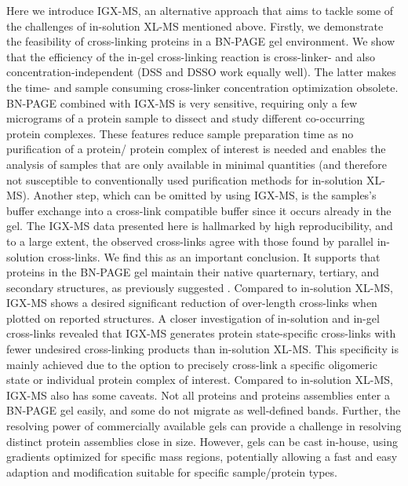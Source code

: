Here we introduce IGX-MS, an alternative approach that aims to tackle some of the challenges of in-solution XL-MS mentioned above. Firstly, we demonstrate the feasibility of cross-linking proteins in a BN-PAGE gel environment. We show that the efficiency of the in-gel cross-linking reaction is cross-linker- and also concentration-independent (DSS and DSSO work equally well). The latter makes the time- and sample consuming cross-linker concentration optimization obsolete. BN-PAGE combined with IGX-MS is very sensitive, requiring only a few micrograms of a protein sample to dissect and study different co-occurring protein complexes. These features reduce sample preparation time as no purification of a protein/ protein complex of interest is needed and enables the analysis of samples that are only available in minimal quantities (and therefore not susceptible to conventionally used purification methods for in-solution XL-MS). Another step, which can be omitted by using IGX-MS, is the samples's buffer exchange into a cross-link compatible buffer since it occurs already in the gel. The IGX-MS data presented here is hallmarked by high reproducibility, and to a large extent, the observed cross-links agree with those found by parallel in-solution cross-links. We find this as an important conclusion. It supports that proteins in the BN-PAGE gel maintain their native quarternary, tertiary, and secondary structures, as previously suggested \cite{Poetsch_2000, Schafer_2006, Wittig_2007}. Compared to in-solution XL-MS, IGX-MS shows a desired significant reduction of over-length cross-links when plotted on reported structures. A closer investigation of in-solution and in-gel cross-links revealed that IGX-MS generates protein state-specific cross-links with fewer undesired cross-linking products than in-solution XL-MS. This specificity is mainly achieved due to the option to precisely cross-link a specific oligomeric state or individual protein complex of interest. Compared to in-solution XL-MS, IGX-MS also has some caveats. Not all proteins and proteins assemblies enter a BN-PAGE gel easily, and some do not migrate as well-defined bands. Further, the resolving power of commercially available gels can provide a challenge in resolving distinct protein assemblies close in size. However, gels can be cast in-house, using gradients optimized for specific mass regions, potentially allowing a fast and easy adaption and modification suitable for specific sample/protein types.\\
